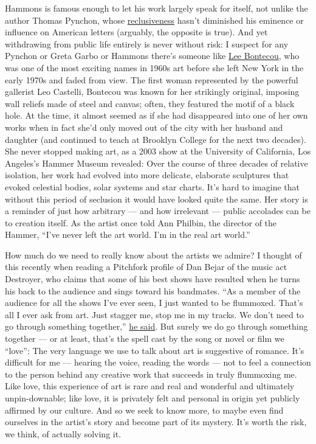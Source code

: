 Hammons is famous enough to let his work largely speak for itself, not
unlike the author Thomas Pynchon, whose
\href{https://www.nytimes.com/2017/11/14/t-magazine/artistic-recluse-jd-salinger-thomas-pynchon.html}{reclusiveness}
hasn't diminished his eminence or influence on American letters
(arguably, the opposite is true). And yet withdrawing from public life
entirely is never without risk: I suspect for any Pynchon or Greta Garbo
or Hammons there's someone like
\href{https://www.moma.org/artists/670}{Lee Bontecou}, who was one of
the most exciting names in 1960s art before she left New York in the
early 1970s and faded from view. The first woman represented by the
powerful gallerist Leo Castelli, Bontecou was known for her strikingly
original, imposing wall reliefs made of steel and canvas; often, they
featured the motif of a black hole. At the time, it almost seemed as if
she had disappeared into one of her own works when in fact she'd only
moved out of the city with her husband and daughter (and continued to
teach at Brooklyn College for the next two decades). She never stopped
making art, as a 2003 show at the University of California, Los
Angeles's Hammer Museum revealed: Over the course of three decades of
relative isolation, her work had evolved into more delicate, elaborate
sculptures that evoked celestial bodies, solar systems and star charts.
It's hard to imagine that without this period of seclusion it would have
looked quite the same. Her story is a reminder of just how arbitrary ---
and how irrelevant --- public accolades can be to creation itself. As
the artist once told Ann Philbin, the director of the Hammer, ``I've
never left the art world. I'm in the real art world.''

How much do we need to really know about the artists we admire? I
thought of this recently when reading a Pitchfork profile of Dan Bejar
of the music act Destroyer, who claims that some of his best shows have
resulted when he turns his back to the audience and sings toward his
bandmates. ``As a member of the audience for all the shows I've ever
seen, I just wanted to be flummoxed. That's all I ever ask from art.
Just stagger me, stop me in my tracks. We don't need to go through
something together,''
\href{https://pitchfork.com/features/profile/destroyer-dan-bejar-have-we-met-interview/}{he
said}. But surely we do go through something together --- or at least,
that's the spell cast by the song or novel or film we ``love'': The very
language we use to talk about art is suggestive of romance. It's
difficult for me --- hearing the voice, reading the words --- not to
feel a connection to the person behind any creative work that succeeds
in truly flummoxing me. Like love, this experience of art is rare and
real and wonderful and ultimately unpin-downable; like love, it is
privately felt and personal in origin yet publicly affirmed by our
culture. And so we seek to know more, to maybe even find ourselves in
the artist's story and become part of its mystery. It's worth the risk,
we think, of actually solving it.

